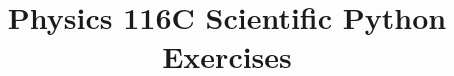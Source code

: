 \documentclass[12pt,oneside]{book}
\begin{document}

\title{Physics 116C Scientific Python Exercises}

\maketitle




%
\end{document}
